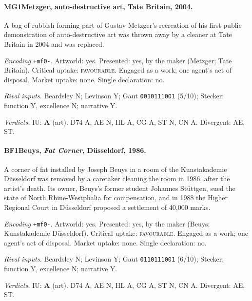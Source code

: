 \paragraph{MG1\enspace Metzger, auto-destructive art, Tate Britain, 2004.}
A bag of rubbish forming part of Gustav Metzger's recreation of his first public demonstration of auto-destructive art was thrown away by a cleaner at Tate Britain in 2004 and was replaced.\par
\noindent\textit{Encoding} \texttt{+mf0-}. Artworld: yes. Presented: yes, by the maker (Metzger; Tate Britain). Critical uptake: \textsc{favourable}. Engaged as a work; one agent's act of disposal. Market uptake: none. Single declaration: no.\par
\noindent\textit{Rival inputs.} Beardsley N; Levinson Y; Gaut \texttt{0010111001} (5/10); Stecker: function Y, excellence N; narrative Y.\par
\noindent\textit{Verdicts.} IU: \textbf{A} (art). D74 A, AE N, HL A, CG A, ST N, CN A. Divergent: AE, ST.\par

\paragraph{BF1\enspace Beuys, \emph{Fat Corner}, D\"usseldorf, 1986.}
A corner of fat installed by Joseph Beuys in a room of the Kunstakademie D\"usseldorf was removed by a caretaker cleaning the room in 1986, after the artist's death. Its owner, Beuys's former student Johannes St\"uttgen, sued the state of North Rhine-Westphalia for compensation, and in 1988 the Higher Regional Court in D\"usseldorf proposed a settlement of 40{,}000 marks.\par
\noindent\textit{Encoding} \texttt{+mf0-}. Artworld: yes. Presented: yes, by the maker (Beuys; Kunstakademie D\"usseldorf). Critical uptake: \textsc{favourable}. Engaged as a work; one agent's act of disposal. Market uptake: none. Single declaration: no.\par
\noindent\textit{Rival inputs.} Beardsley N; Levinson Y; Gaut \texttt{0110111001} (6/10); Stecker: function Y, excellence N; narrative Y.\par
\noindent\textit{Verdicts.} IU: \textbf{A} (art). D74 A, AE N, HL A, CG A, ST N, CN A. Divergent: AE, ST.\par

